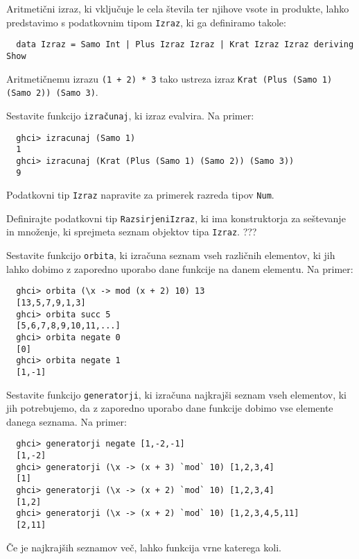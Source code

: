 \documentclass[arhiv]{../izpit}
\begin{document}


Aritmetični izraz, ki vključuje le cela števila ter njihove vsote in produkte,
lahko predstavimo s podatkovnim tipom \texttt{Izraz}, ki ga definiramo takole:
\begin{verbatim}
  data Izraz = Samo Int | Plus Izraz Izraz | Krat Izraz Izraz deriving Show
\end{verbatim}
Aritmetičnemu izrazu \texttt{(1 + 2) * 3} tako ustreza izraz \texttt{Krat (Plus (Samo 1) (Samo 2)) (Samo 3)}.

\podnaloga
  Sestavite funkcijo \texttt{izračunaj}, ki izraz evalvira. Na primer:
  \begin{verbatim}
  ghci> izracunaj (Samo 1)
  1
  ghci> izracunaj (Krat (Plus (Samo 1) (Samo 2)) (Samo 3))
  9
  \end{verbatim}

\podnaloga
  Podatkovni tip \texttt{Izraz} napravite za primerek razreda tipov \texttt{Num}.

\podnaloga
  Definirajte podatkovni tip \texttt{RazsirjeniIzraz}, ki ima konstruktorja
  za seštevanje in množenje, ki sprejmeta seznam objektov tipa \texttt{Izraz}.
  ???


\podnaloga
  Sestavite funkcijo \texttt{orbita}, ki izračuna seznam vseh različnih
  elementov, ki jih lahko dobimo z zaporedno uporabo dane funkcije na danem
  elementu. Na primer:
  \begin{verbatim}
  ghci> orbita (\x -> mod (x + 2) 10) 13
  [13,5,7,9,1,3]
  ghci> orbita succ 5
  [5,6,7,8,9,10,11,...]
  ghci> orbita negate 0
  [0]
  ghci> orbita negate 1
  [1,-1]
  \end{verbatim}

\podnaloga
  Sestavite funkcijo \texttt{generatorji}, ki izračuna najkrajši seznam vseh
  elementov, ki jih potrebujemo, da z zaporedno uporabo dane funkcije dobimo
  vse elemente danega seznama. Na primer:
  \begin{verbatim}
  ghci> generatorji negate [1,-2,-1]
  [1,-2]
  ghci> generatorji (\x -> (x + 3) `mod` 10) [1,2,3,4]
  [1]
  ghci> generatorji (\x -> (x + 2) `mod` 10) [1,2,3,4]
  [1,2]
  ghci> generatorji (\x -> (x + 2) `mod` 10) [1,2,3,4,5,11]
  [2,11] 
  \end{verbatim}
  Če je najkrajših seznamov več, lahko funkcija vrne katerega koli.
\end{document}
